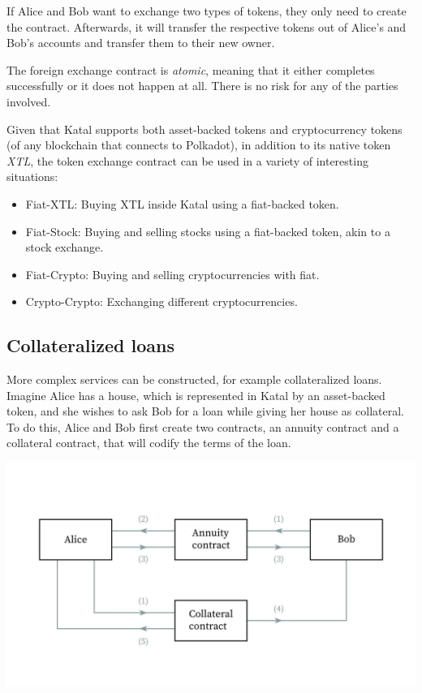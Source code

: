 \documentclass[conference]{IEEEtran}
\begin{document}
If Alice and Bob want to exchange two types of tokens, they only need to create the contract. Afterwards, it will transfer the respective tokens out of Alice's and Bob's accounts and transfer them to their new owner.

The foreign exchange contract is \textit{atomic}, meaning that it either completes successfully or it does not happen at all. There is no risk for any of the parties involved.

Given that Katal supports both asset-backed tokens and cryptocurrency tokens (of any blockchain that connects to Polkadot), in addition to its native token \textit{XTL}, the token exchange contract can be used in a variety of interesting situations:

\begin{itemize}
	\item Fiat-XTL: Buying XTL inside Katal using a fiat-backed token.
	\item Fiat-Stock: Buying and selling stocks using a fiat-backed token, akin to a stock exchange.
	\item Fiat-Crypto: Buying and selling cryptocurrencies with fiat.
	\item Crypto-Crypto: Exchanging different cryptocurrencies.
\end{itemize}

\subsection{Collateralized loans}
More complex services can be constructed, for example collateralized loans. Imagine Alice has a house, which is represented in Katal by an asset-backed token, and she wishes to ask Bob for a loan while giving her house as collateral. To do this, Alice and Bob first create two contracts, an annuity contract and a collateral contract, that will codify the terms of the loan.

\includegraphics[width=\linewidth]{images/collateralized_loan.jpg}
\end{document}
